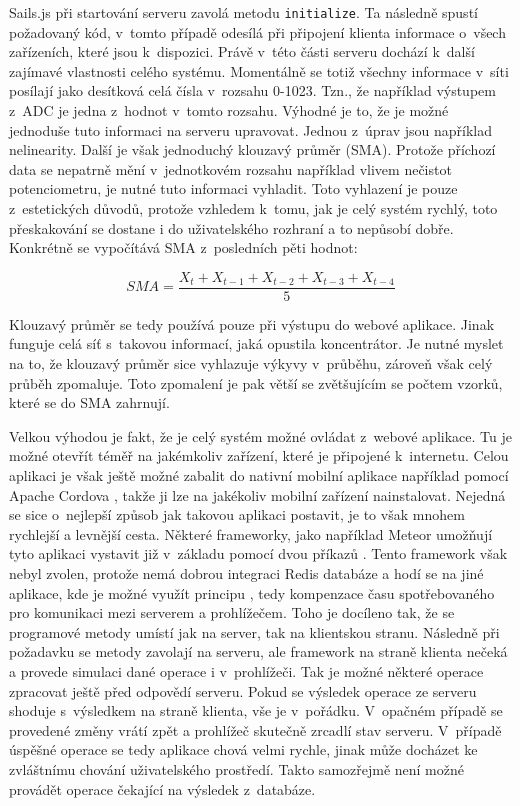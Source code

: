 Sails.js při startování serveru zavolá metodu \texttt{initialize}. Ta následně spustí požadovaný kód, v~tomto případě odesílá při připojení klienta informace o~všech zařízeních, které jsou k~dispozici. Právě v~této části serveru dochází k~další zajímavé vlastnosti celého systému. Momentálně se totiž všechny informace v~síti posílají jako desítková celá čísla v~rozsahu 0-1023. Tzn., že například výstupem z~ADC je jedna z~hodnot v~tomto rozsahu. Výhodné je to, že je možné jednoduše tuto informaci na serveru upravovat. Jednou z~úprav jsou například nelinearity. Další je však jednoduchý klouzavý průměr (SMA).  Protože příchozí data se nepatrně mění v~jednotkovém rozsahu například vlivem nečistot potenciometru, je nutné tuto informaci vyhladit. Toto vyhlazení je pouze z~estetických důvodů, protože vzhledem k~tomu, jak je celý systém rychlý, toto přeskakování se dostane i do uživatelského rozhraní a to nepůsobí dobře. Konkrétně se vypočítává SMA z~posledních pěti hodnot:

\begin{equation}
	SMA = \dfrac{X_t + X_{t-1} + X_{t-2} + X_{t-3} + X_{t-4}}{5}
	\label{eq:sma}
\end{equation}

Klouzavý průměr se tedy používá pouze při výstupu do webové aplikace. Jinak funguje celá síť s~takovou informací, jaká opustila koncentrátor. Je nutné myslet na to, že klouzavý průměr sice vyhlazuje výkyvy v~průběhu, zároveň však celý průběh zpomaluje. Toto zpomalení je pak větší se zvět\-šu\-jí\-cím se počtem vzorků, které se do SMA zahrnují.

Velkou výhodou je fakt, že je celý systém možné ovládat z~webové aplikace. Tu je možné otevřít téměř na jakémkoliv zařízení, které je připojené k~internetu. Celou aplikaci je však ještě možné zabalit do nativní mobilní aplikace například pomocí Apache Cordova \cite{cordova}, takže ji lze na jakékoliv mobilní zařízení nainstalovat.  Nejedná se sice o~nejlepší způsob jak takovou aplikaci postavit, je to však mnohem rychlejší a levnější cesta. Některé frameworky, jako například Meteor umožňují tyto aplikaci vystavit již v~základu pomocí dvou příkazů \cite{meteor}. Tento framework však nebyl zvolen, protože nemá dobrou integraci Redis \cite{redis} databáze a hodí se na jiné aplikace, kde je možné využít principu ,  tedy kompenzace času spotřebovaného pro komunikaci mezi serverem a prohlížečem. Toho je docíleno tak, že se programové metody umístí jak na server, tak na klientskou stranu. Následně při požadavku se metody zavolají na serveru, ale framework na straně klienta nečeká a provede simulaci dané operace i v~prohlížeči. Tak je možné některé operace zpracovat ještě před odpovědí serveru. Pokud se výsledek operace ze serveru shoduje s~výsledkem na straně klienta, vše je v~pořádku. V~opačném případě se provedené změny vrátí zpět a prohlížeč skutečně zrcadlí stav serveru. V~případě úspěšné operace se tedy aplikace chová velmi rychle, jinak může docházet ke zvláštnímu chování uživatelského prostředí. Takto samozřejmě není možné provádět operace čekající na výsledek z~databáze.